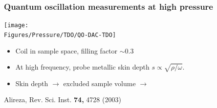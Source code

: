 \begin{frame}[label=DACcoil]
\frametitle{Quantum oscillation measurements at high pressure}

\centerline{\texttt{[image: \\Figures/Pressure/TDO/QO-DAC-TDO]}}
\begin{itemize}

\item
Coil in sample space, filling factor $\sim 0.3$

\item
At high frequency, probe metallic skin depth $s \propto
\sqrt{\rho/\omega}$.

\item 
Skin depth $\rightarrow$ excluded sample volume $\rightarrow$ \\ 
\end{itemize}


\vspace*{\fill}
\centerline{\makebox[\linewidth]{\rule{0.85\textwidth}{0.4pt}}}
\centerline{\scriptsize Alireza, Rev. Sci. Inst. {\bf 74,} 4728 (2003)}

\end{frame}


